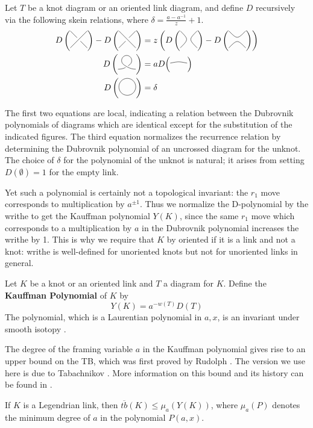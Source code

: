 Let $T$ be a knot diagram or an oriented link diagram, and define $D$ recursively via the following skein relations, where $\delta = \frac{a - a^{-1}}{z} + 1$.
\begin{align}
    D\left(\Lmin\right) - D\left(\Lplus\right) &= z \left( D\left(\Lzero\right) - D\left(\Linf\right) \right) \\
    D\left(\Lr\right) &= a D \Big(\Ln\Big)\\
    D\left(\Lu\right) &= \delta
\end{align}

The first two equations are local, indicating a relation between the Dubrovnik polynomials of diagrams which are identical except for the substitution of the indicated figures. The third equation normalizes the recurrence relation by determining the Dubrovnik polynomial of an uncrossed diagram for the unknot. The choice of $\delta$ for the polynomial of the unknot is natural; it arises from setting $D(\emptyset) = 1$ for the empty link.

Yet such a polynomial is certainly not a topological invariant: the $r_1$ move corresponds to multiplication by $a^{\pm 1}$. Thus we normalize the D-polynomial by the writhe to get the Kauffman polynomial $Y(K)$, since the same $r_1$ move which corresponds to a multiplication by $a$ in the Dubrovnik polynomial increases the writhe by 1. This is why we require that $K$ by oriented if it is a link and not a knot: writhe is well-defined for unoriented knots but not for unoriented links in general.
\begin{definition}
    Let $K$ be a knot or an oriented link and $T$ a diagram for $K$. Define the \textbf{Kauffman Polynomial} of $K$ by
    \[
        Y(K) = a^{-w(T)} D(T)
    \]
    The polynomial, which is a Laurentian polynomial in $a, x$, is an invariant under smooth isotopy \cite{kauffman}.
\end{definition}

The degree of the framing variable $a$ in the Kauffman polynomial gives rise to an upper bound on the TB, which was first proved by Rudolph \cite{rudolph}. The version we use here is due to Tabachnikov \cite{tabachnikov}. More information on this bound and its history can be found in \cite{ferrand}.

\begin{theorem}\label{kauffman-bound}
    If $K$ is a Legendrian link, then $\overline{tb}(K) \leq \mu_a(Y(K))$, where $\mu_a(P)$ denotes the minimum degree of $a$ in the polynomial $P(a, x)$.
\end{theorem}


